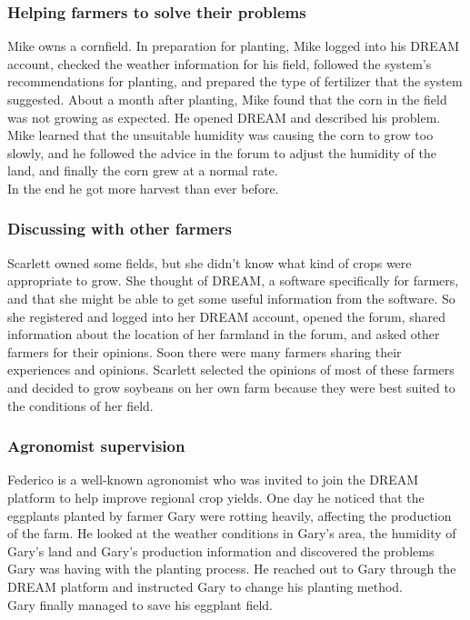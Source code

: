 \documentclass[../../main.tex]{subfiles}
\begin{document}
\subsubsection{Helping farmers to solve their problems}

  Mike owns a cornfield. In preparation for planting, Mike logged into his DREAM account, checked the weather information for his field, followed the system's recommendations for planting, and prepared the type of fertilizer that the system suggested. About a month after planting, Mike found that the corn in the field was not growing as expected. He opened DREAM and described his problem. Mike learned that the unsuitable humidity was causing the corn to grow too slowly, and he followed the advice in the forum to adjust the humidity of the land, and finally the corn grew at a normal rate.\\ 
  In the end he got more harvest than ever before.


\subsubsection{Discussing with other farmers}

  Scarlett owned some fields, but she didn't know what kind of crops were appropriate to grow. She thought of DREAM, a software specifically for farmers, and that she might be able to get some useful information from the software. So she registered and logged into her DREAM account, opened the forum, shared information about the location of her farmland in the forum, and asked other farmers for their opinions. Soon there were many farmers sharing their experiences and opinions. Scarlett selected the opinions of most of these farmers and decided to grow soybeans on her own farm because they were best suited to the conditions of her field.

\subsubsection{Agronomist supervision}

 Federico is a well-known agronomist who was invited to join the DREAM platform to help improve regional crop yields. One day he noticed that the eggplants planted by farmer Gary were rotting heavily, affecting the production of the farm. He looked at the weather conditions in Gary's area, the humidity of Gary's land and Gary's production information and discovered the problems Gary was having with the planting process. He reached out to Gary through the DREAM platform and instructed Gary to change his planting method.\\
Gary finally managed to save his eggplant field.
\end{document}
